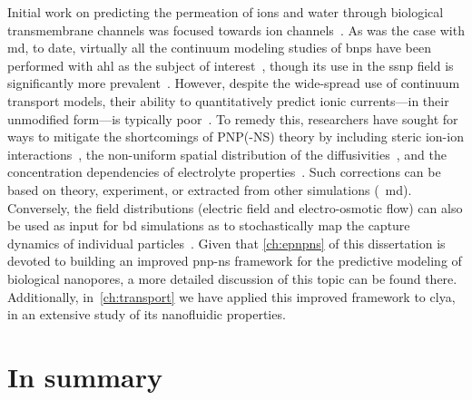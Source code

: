 Initial work on predicting the permeation of ions and water through biological transmembrane channels was
focused towards ion channels~\cite{Eisenberg-1996,Chen-1997,Corry-2003}. As was the case with \gls{md}, to
date, virtually all the continuum modeling studies of \glspl{bnp} have been performed with \gls{ahl} as the
subject of
interest~\cite{Noskov-2004,Cozmuta-2005,OKeeffe-2007,Simakov-2010,Pederson-2015,Simakov-2018,Aguilella-Arzo-2020},
though its use in the \gls{ssnp} field is significantly more
prevalent~\cite{Daiguji-2004,Cervera-2005,White-2008,Lu-2012,Chaudhry-2014,Laohakunakorn-2015,Hulings-2018,Rigo-2019,Melnikov-2020}.
However, despite the wide-spread use of continuum transport models, their ability to quantitatively predict
ionic currents---in their unmodified form---is typically poor~\cite{Corry-2000,Collins-2012}. To remedy this,
researchers have sought for ways to mitigate the shortcomings of {PNP}(-{NS}) theory by including steric
ion-ion interactions~\cite{Kilic-2007,Lu-2011,Liu-2020}, the non-uniform spatial distribution of the
diffusivities~\cite{Cozmuta-2005,Furini-2006,Simakov-2010,}, and the concentration dependencies of electrolyte
properties~\cite{Baldessari-2008-1,Burger-2012,Chen-2016}. Such corrections can be based on theory,
experiment, or extracted from other simulations (\eg~\gls{md}). Conversely, the field distributions (electric
field and electro-osmotic flow) can also be used as input for \gls{bd} simulations as to stochastically map
the capture dynamics of individual particles~\cite{Pederson-2015,Hulings-2018}. Given that \cref{ch:epnpns} of
this dissertation is devoted to building an improved \gls{pnp-ns} framework for the predictive modeling of
biological nanopores, a more detailed discussion of this topic can be found there. Additionally,
in~\cref{ch:transport} we have applied this improved framework to \gls{clya}, in an extensive study of its
nanofluidic properties.


%
%

\section{In summary}
%


